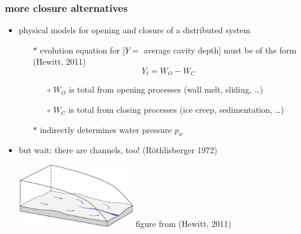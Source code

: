 \documentclass[hide notes,intlimits]{beamer}
\begin{document}
\begin{frame}
  \frametitle{more closure alternatives}

      \begin{itemize}
      \item physical models for opening and closure of a distributed system
        \begin{itemize}
        \item[$\ast$]  evolution equation for [$Y=$ average cavity depth] must be of the form (Hewitt, 2011)
        $$Y_t = W_O - W_C$$
          \begin{itemize}
          \vspace{-4mm}
          \item[$\circ$] $W_O$ is total from opening processes (wall melt, sliding, \dots)
          \item[$\circ$] $W_C$ is total from closing processes (ice creep, sedimentation, \dots)
          \end{itemize}
        \item[$\ast$] indirectly determines water pressure $p_w$
        \end{itemize}
      
      \bigskip
      \item but wait: there are channels, too! (R\"othlisberger 1972)

\begin{center}
\medskip
\includegraphics[width=0.4\textwidth]{hewitt-cartoon} \tiny figure from (Hewitt, 2011)
\medskip
\end{center}
    \end{itemize}
\end{frame}
\end{document}
